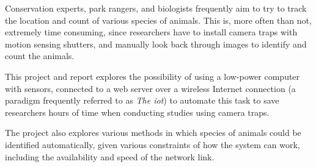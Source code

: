 Conservation experts, park rangers, and biologists frequently aim to try to
track the location and count of various species of animals. This is, more
often than not, extremely time consuming, since researchers have to install
camera traps with motion sensing shutters, and manually look back through
images to identify and count the animals.

This project and report explores the possibility of using a low-power
computer with sensors, connected to a web server over a wireless Internet
connection (a paradigm frequently referred to as \textit{The \acrfull{iot}})
to automate this task to save researchers hours of time when conducting
studies using camera traps.

The project also explores various methods in which species of animals could
be identified automatically, given various constraints of how the system can
work, including the availability and speed of the network link.
